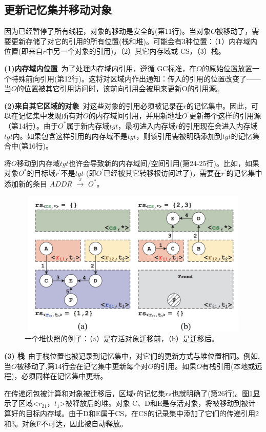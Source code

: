 \subsection{更新记忆集并移动对象}

因为已经暂停了所有线程，对象的移动是安全的(第11行)。当对象$O$被移动了，需要更新存储了对它的引用的所有位置(栈和堆)。可能会有3种位置：（1）内存域内位置(即来自$r$中另一个对象的引用)，（2）其它内存域或 CS，（3）栈。

\textbf{(1)内存域内位置}\ 为了处理内存域内引用，遵循 GC标准，在$O$的原始位置放置一个特殊前向引用(第12行)。这将对区域内作出通知：传入的引用的位置改变了——当$O$的位置被其它引用访问时，该前向引用会被用来更新O的引用源。

\textbf{(2)来自其它区域的对象}\ 对这些对象的引用必须被记录在$r$的记忆集中。因此，可以在记忆集中发现所有对$O$的内存域间引用，并用新地址$O^{'}$更新每个这样的引用源（第14行）。由于$O^{*}$属于新内存域$tgt$，最初进入内存域$r$的引用现在会进入内存域$tgt$内。如果包含这样引用的内存域不是$tgt$，则该引用需被明确添加到${tgt}$的记忆集合中(第16行)。

将$O$移动到内存域${tgt}$也许会导致新的内存域间/空间引用(第24-25行)。比如，如果对象$O^{*}$的目标域$r^{'}$不是$tgt$ (即$O^{'}$已经被其它转移根访问过了)，需要在$r^{'}$的记忆集中添加新的条目 ${ADDR}$ $\xrightarrow{x}$ $O^{*}$。


\begin{figure}[H]
    \centering
    \includegraphics[width=12cm,height=7cm]{figure/snapshot.jpg}
    \caption{
        一个堆快照的例子：（a）是存活对象迁移前，（b）是迁移后。
    }
    \label{snapshot}
\end{figure}
\textbf{(3) 栈}\ 由于栈位置也被记录到记忆集中，对它们的更新方式与堆位置相同。例如,当$O$被移动了,第14行会在记忆集中更新每个对$O$的引用。如果$O$有栈引用(本地或远程)，必须同样在记忆集中更新。

在传递闭包被计算和对象被迁移后，区域$r$的记忆集$rs$也就明确了(第26行)。图\ref{snapshot}显示了区域<$r_{21}$，$t_1$>被释放后的堆。对象 C、D和E是存活对象，将被移动到被计算好的目标内存域。由于D和E属于CS，在CS的记录集中添加了它们的传递引用2和3。对象F不可达，因此被自动释放。

